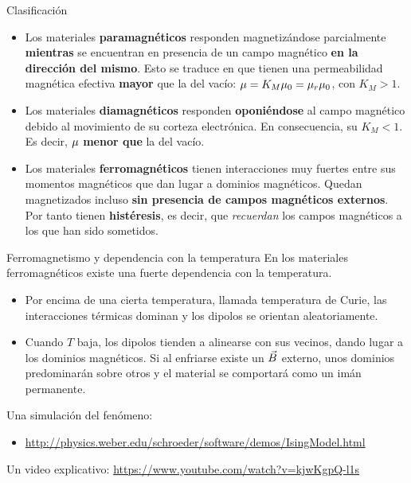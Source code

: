 \documentclass[]{presentation}
\begin{document}
\begin{frame}{Clasificación}
	\begin{itemize}
		\justifying
		\item Los materiales \textbf{paramagnéticos} responden magnetizándose parcialmente \textbf{mientras} se encuentran en presencia de un campo magnético \textbf{en la dirección del mismo}. Esto se traduce en que tienen una permeabilidad magnética efectiva \textbf{mayor} que la del vacío: $\mu = K_M \mu_0 = \mu_r \mu_0 $, con $K_M > 1$.
		\item Los materiales \textbf{diamagnéticos} responden \textbf{oponiéndose} al campo magnético debido al movimiento de su corteza electrónica. En consecuencia, su $K_M < 1$. Es decir, $\mu$ \textbf{menor que} la del vacío.
		\item Los materiales \textbf{ferromagnéticos} tienen interacciones muy fuertes entre sus momentos magnéticos que dan lugar a dominios magnéticos. Quedan magnetizados incluso \textbf{sin presencia de campos magnéticos externos}. Por tanto tienen \textbf{histéresis}, es decir, que \textit{recuerdan} los campos magnéticos a los que han sido sometidos.
	\end{itemize}
\end{frame}

\begin{frame}{Ferromagnetismo y dependencia con la temperatura}
En los materiales ferromagnéticos existe una fuerte dependencia con la temperatura. 
\begin{itemize}
\item Por encima de una cierta temperatura, llamada temperatura de Curie, las interacciones térmicas dominan y los dipolos se orientan aleatoriamente.
\item Cuando $T$ baja, los dipolos tienden a alinearse con sus vecinos, dando lugar a los dominios magnéticos. Si al enfriarse existe un $\vec{B}$ externo, unos dominios predominarán sobre otros y el material se comportará como un imán permanente.
\end{itemize} 
Una simulación del fenómeno:
\begin{itemize}
\item  {\scriptsize \url{http://physics.weber.edu/schroeder/software/demos/IsingModel.html}}
\end{itemize}
Un video explicativo: {\scriptsize \url{https://www.youtube.com/watch?v=kjwKgpQ-l1s}}
\end{frame}
\end{document}
